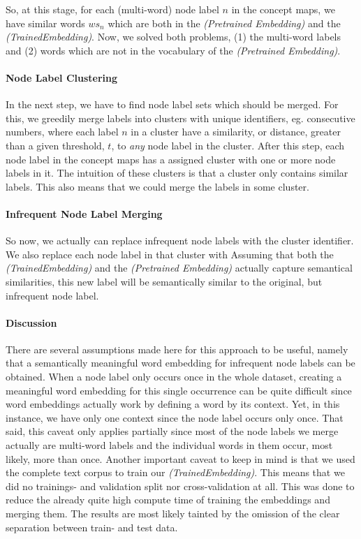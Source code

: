 So, at this stage, for each (multi-word) node label $n$ in the concept maps, we have similar words $ws_n$ which are both in the \textit{(Pretrained Embedding)} and the \textit{(TrainedEmbedding)}.
Now, we solved both problems, (1) the multi-word labels and (2) words which are not in the vocabulary of the \textit{(Pretrained Embedding)}.

\paragraph{Node Label Clustering}
In the next step, we have to find node label sets which should be merged.
For this, we greedily merge labels into clusters with unique identifiers, eg. consecutive numbers, where each label $n$ in a cluster have a similarity, or distance, greater than a given threshold, $t$, to \textit{any} node label in the cluster.
After this step, each node label in the concept maps has a assigned cluster with one or more node labels in it.
The intuition of these clusters is that a cluster only contains similar labels.
This also means that we could merge the labels in some cluster.

\paragraph{Infrequent Node Label Merging}
So now, we actually can replace infrequent node labels with the cluster identifier.
We also replace each node label in that cluster with 
Assuming that both the \textit{(TrainedEmbedding)} and the \textit{(Pretrained Embedding)} actually capture semantical similarities, this new label will be semantically similar to the original, but infrequent node label.

\paragraph{Discussion}
There are several assumptions made here for this approach to be useful, namely that a semantically meaningful word embedding for infrequent node labels can be obtained.
When a node label only occurs once in the whole dataset, creating a meaningful word embedding for this single occurrence can be quite difficult since word embeddings actually work by defining a word by its context.
Yet, in this instance, we have only one context since the node label occurs only once.
That said, this caveat only applies partially since most of the node labels we merge actually are multi-word labels and the individual words in them occur, most likely, more than once.
Another important caveat to keep in mind is that we used the complete text corpus to train our \textit{(TrainedEmbedding)}.
This means that we did no trainings- and validation split nor cross-validation at all.
This was done to reduce the already quite high compute time of training the embeddings and merging them.
The results are most likely tainted by the omission of the clear separation between train- and test data.

